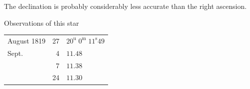 \par\indent The declination is probably considerably less accurate than the right ascension.

\par\indent [Manuscript:] Observations of this star
\begin{center}\fontsize{10}{12}\selectfont\begin{tabular}{lrl}
August 1819 & 27 & $20^{\mathrm u}\;0^{\mathrm m}\;11^{\mathrm s}49$\\
Sept. & 4 & $11.48$\\
& 7 & $11.38$\\
& 24 & $11.30$\\
\end{tabular}\end{center}


